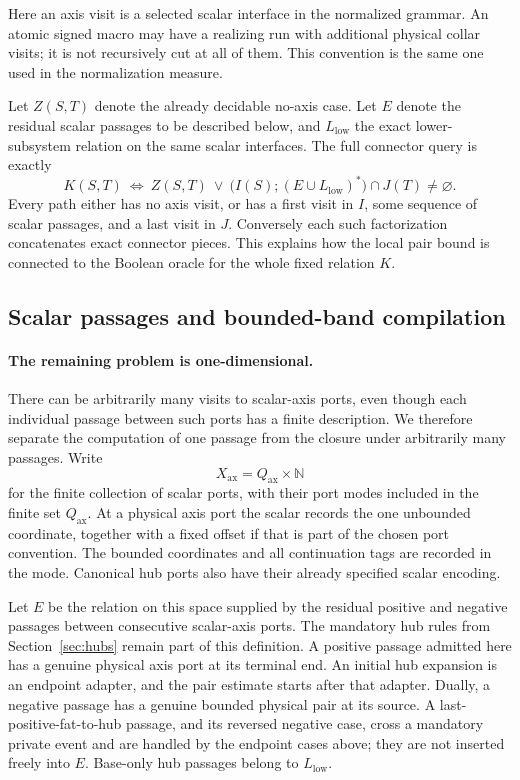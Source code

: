 \documentclass[11pt,a4paper]{article}
\theoremstyle{remark}
\newcommand{\N}{\mathbb N}
\begin{document}
Here an axis visit is a selected scalar interface in the normalized
grammar. An atomic signed macro may have a realizing run with
additional physical collar visits; it is not recursively cut at all
of them. This convention is the same one used in the normalization
measure.

Let \(Z(S,T)\) denote the already decidable no-axis case. Let
\(E\) denote the residual scalar passages to be described below, and
\(L_{\mathrm{low}}\) the exact lower-subsystem relation on the same
scalar interfaces. The full connector query is exactly
\begin{equation}
 \boxed{\quad
 K(S,T)\ \Longleftrightarrow\ Z(S,T)\ \lor\
 \bigl(I(S);(E\cup L_{\mathrm{low}})^*\bigr)\cap J(T)\ne\varnothing.
 \quad}\label{eq:kernel-reduction}
\end{equation}
Every path either has no axis visit, or has a first visit in \(I\),
some sequence of scalar passages, and a last visit in \(J\).
Conversely each such factorization concatenates exact connector
pieces. This explains how the local pair bound is connected to the
Boolean oracle for the whole fixed relation \(K\).

\subsection{Scalar passages and bounded-band compilation}

\paragraph{The remaining problem is one-dimensional.}
There can be arbitrarily many visits to scalar-axis ports, even though
each individual passage between such ports has a finite description.
We therefore separate the computation of one passage from the closure
under arbitrarily many passages.  Write
\[
X_{\mathrm{ax}}=Q_{\mathrm{ax}}\times\N
\]
for the finite collection of scalar ports, with their port modes included
in the finite set \(Q_{\mathrm{ax}}\).  At a physical axis port the scalar
records the one unbounded coordinate, together with a fixed offset if
that is part of the chosen port convention.  The bounded coordinates and
all continuation tags are recorded in the mode.  Canonical hub ports
also have their already specified scalar encoding.

Let \(E\) be the relation on this space supplied by the residual
positive and negative passages between consecutive scalar-axis ports.
The mandatory hub rules from Section~\ref{sec:hubs} remain part of this
definition. A positive passage admitted here has a genuine physical
axis port at its terminal end. An initial hub expansion is an endpoint
adapter, and the pair estimate starts after that adapter. Dually, a
negative passage has a genuine bounded physical pair at its source.
A last-positive-fat-to-hub passage, and its reversed negative case,
cross a mandatory private event and are handled by the endpoint cases
above; they are not inserted freely into \(E\).
Base-only hub passages belong to \(L_{\mathrm{low}}\).
\end{document}
